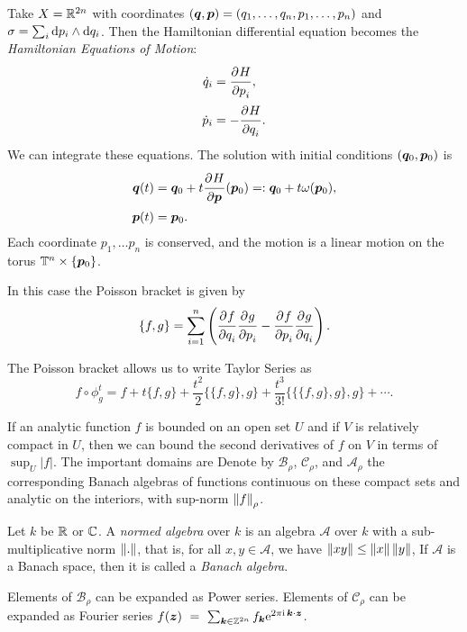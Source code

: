 \documentclass[twoside,letterpaper,10pt]{article}
\begin{document}
\begin{exmp}
  Take $X = \mathbb{R}^{2n}$ with coordinates
  $(\bm{q}, \bm{p}) = (q_1, \ldots, q_n, p_1, \ldots, p_n)$ and
  $\sigma = \sum_i \mathop{}\!\mathrm{d} p_i \wedge \mathop{}\!\mathrm{d} q_i$.
  Then the Hamiltonian differential equation becomes the \emph{Hamiltonian
    Equations of Motion}:
  \begin{align*}
    \dot{q}_i &= \frac{\strut\partial^{}H}{\strut\partial p_i^{}},\\
    \dot{p}_i &= -\frac{\strut\partial^{}H}{\strut\partial q_i^{}}.
  \end{align*}
  We can integrate these equations.
  The solution with initial conditions $(\bm{q}_0, \bm{p}_0)$ is
  \begin{align*}
    \bm{q}(t) &= \bm{q}_0 + t \frac{\strut\partial^{}H}{\strut\partial\bm{p}^{}}(\bm{p}_0) =: \bm{q}_0 + t
                \omega(\bm{p}_0),\\
    \bm{p}(t) &= \bm{p}_0.
  \end{align*}
  Each coordinate $p_1, \ldots p_n$ is conserved, and the motion is a linear
  motion on the torus $\mathbb{T}^n \times \{\bm{p}_0\}$.
  
  In this case the Poisson bracket is given by
  \begin{equation*}
    \{f, g\} = \sum_{i = 1}^n \left( \frac{\strut\partial^{}f}{\strut\partial q_i^{}} \frac{\strut\partial^{}g}{\strut\partial p_i^{}} - \frac{\strut\partial^{}f}{\strut\partial p_i^{}}
      \frac{\strut\partial^{}g}{\strut\partial q_i^{}} \right).
  \end{equation*}
\end{exmp}
The Poisson bracket allows us to write Taylor Series as
\begin{equation*}
  f \circ \phi^t_g = f + t \{f, g\} + \frac{t^2}{2} \{ \{f, g\}, g\} +
  \frac{t^3}{3!} \{ \{ \{f, g\}, g\}, g\} + \cdots.
\end{equation*}

\begin{defn}
  \dionumber{}
\end{defn}

\begin{defn}
  \diovector
\end{defn}

If an analytic function $f$ is bounded on an open set $U$ and if $V$ is
relatively compact in $U$, then we can bound the second derivatives of $f$ on
$V$ in terms of $\sup_U |f|$.
The important domains are
\domains{}
Denote by $\mathcal{B}_\rho$,
$\mathcal{C}_\rho$, and $\mathcal{A}_\rho$ the corresponding Banach algebras of
functions continuous on these compact sets and analytic on the interiors, with
sup-norm $\norm{f}_{\rho}$.
\begin{defn}
  Let $k$ be $\mathbb{R}$ or $\mathbb{C}$.
  A \emph{normed algebra} over $k$ is an algebra $\mathcal{A}$ over $k$ with a
  sub-multiplicative norm $\norm{.}$, that is, for all $x, y \in \mathcal{A}$,
  we have $\norm{xy} \leq \norm{x} \norm{y}$,
  If $\mathcal{A}$ is a Banach space, then it is called a \emph{Banach algebra}.
\end{defn}
Elements of $\mathcal{B}_{\rho}$ can be expanded as Power series.
Elements of $\mathcal{C}_{\rho}$ can be expanded as Fourier series
$f(\bm{z})~=~\sum_{\bm{k} \in \mathbb{Z}^{2n}} f_{\bm{k}} \mathrm{e}^{2 \pi \mathrm{i} \, \bm{k} \cdot
  \bm{z}}$.
\end{document}
